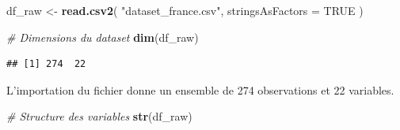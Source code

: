 \documentclass[
]{article}
\newenvironment{Shaded}{\begin{snugshade}}{\end{snugshade}}
\newcommand{\AttributeTok}[1]{\textcolor[rgb]{0.13,0.29,0.53}{#1}}
\newcommand{\CommentTok}[1]{\textcolor[rgb]{0.56,0.35,0.01}{\textit{#1}}}
\newcommand{\ConstantTok}[1]{\textcolor[rgb]{0.56,0.35,0.01}{#1}}
\newcommand{\FunctionTok}[1]{\textcolor[rgb]{0.13,0.29,0.53}{\textbf{#1}}}
\newcommand{\NormalTok}[1]{#1}
\newcommand{\OtherTok}[1]{\textcolor[rgb]{0.56,0.35,0.01}{#1}}
\newcommand{\StringTok}[1]{\textcolor[rgb]{0.31,0.60,0.02}{#1}}
\begin{document}
\begin{Shaded}
\begin{Highlighting}[]
\NormalTok{df\_raw }\OtherTok{\textless{}{-}} \FunctionTok{read.csv2}\NormalTok{(}
  \StringTok{"dataset\_france.csv"}\NormalTok{,}
  \AttributeTok{stringsAsFactors =} \ConstantTok{TRUE}
\NormalTok{)}
\end{Highlighting}
\end{Shaded}

\begin{Shaded}
\begin{Highlighting}[]
\CommentTok{\# Dimensions du dataset}
\FunctionTok{dim}\NormalTok{(df\_raw)}
\end{Highlighting}
\end{Shaded}

\begin{verbatim}
## [1] 274  22
\end{verbatim}

L'importation du fichier donne un ensemble de 274 observations et 22
variables.

\begin{Shaded}
\begin{Highlighting}[]
\CommentTok{\# Structure des variables}
\FunctionTok{str}\NormalTok{(df\_raw)}
\end{Highlighting}
\end{Shaded}
\end{document}
